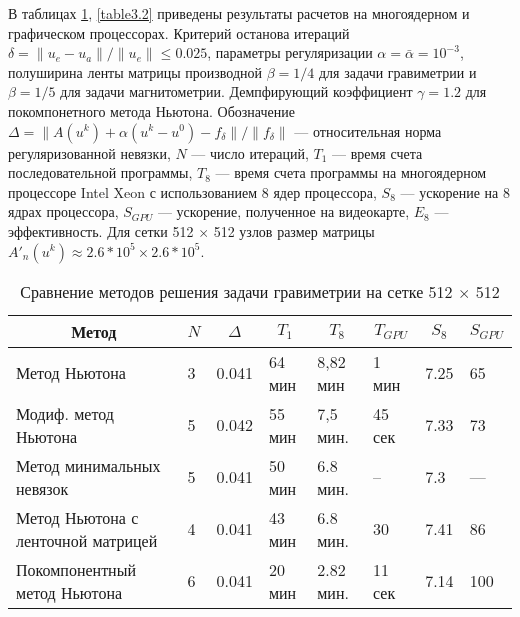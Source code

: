 В таблицах \ref{table3.1}, \ref{table3.2} приведены результаты расчетов на многоядерном и графическом процессорах. Критерий останова итераций $\delta=\|u_e-u_a\|/\|u_e\|\le 0.025$, параметры регуляризации $\alpha=\bar{\alpha}=10^{-3}$, полуширина ленты матрицы производной $\beta=1/4$ для задачи гравиметрии и $\beta=1/5$ для задачи магнитометрии. Демпфирующий коэффициент $\gamma=1.2$ для покомпонетного метода Ньютона. Обозначение $\Delta=\|A(u^k)+\alpha(u^k-u^0)-f_\delta\|/\|f_\delta\|$ --- относительная норма регуляризованной невязки, $N$ --- число итераций, $T_1$ --- время счета последовательной программы, $T_8$ --- время счета программы на многоядерном процессоре Intel Xeon с использованием 8 ядер процессора, $S_8$ --- ускорение на 8 ядрах процессора, $S_{GPU}$ --- ускорение, полученное на видеокарте, $E_8$ --- эффективность. Для сетки 512 $\times$ 512 узлов размер матрицы  $A'_n(u^k)\approx 2.6*10^5\times2.6*10^5$.
\begin{table}[]
	\centering
	\renewcommand{\arraystretch}{1.5}
	\caption{Сравнение методов решения задачи гравиметрии на сетке 512 $\times$ 512}
	\label{table3.1}
	\begin{tabular}{|p{}|l|l|l|l|l|l|l|}
		\hline
		\multicolumn{1}{|c|}{Метод}        & \multicolumn{1}{c|}{$N$} &
		\multicolumn{1}{c|}{$\Delta$} & \multicolumn{1}{c|}{$T_1$} & \multicolumn{1}{c|}{$T_8$} &
		\multicolumn{1}{c|}{$T_{GPU}$} &
		\multicolumn{1}{c|}{$S_8$} & \multicolumn{1}{c|}{$S_{GPU}$}
		\\ \hline
		Метод Ньютона                      &  3        & 0.041                          &       64 мин                  &     8,82 мин &
		1 мин & 7.25 & 65 \\ \hline
		Модиф. метод Ньютона     &         5           & 0.042            & 55 мин                  & 7,5 мин.    &
		45 сек & 7.33 & 73             \\ \hline
		Метод минимальных невязок &  5               & 0.041                    & 50 мин  & 6.8 мин.  &  --   & 7.3 & ---            \\ \hline
		Метод Ньютона с ленточной матрицей &  4               & 0.041                    & 43 мин                  & 6.8 мин. & 30   & 7.41 & 86        \\ \hline
		Покомпонентный метод Ньютона &  6               & 0.041                    & 20 мин  & 2.82 мин.  &  11 сек   & 7.14 & 100            \\ \hline
	\end{tabular}
\end{table}
